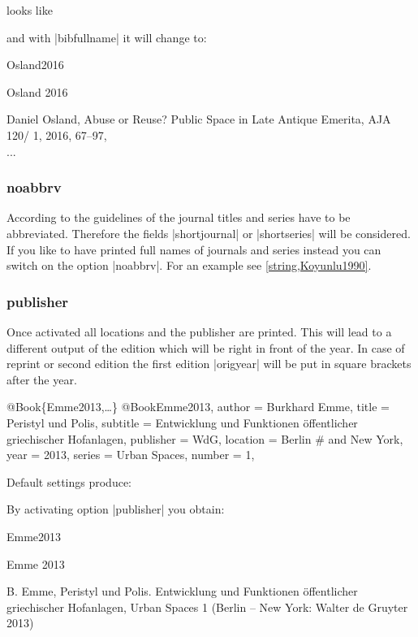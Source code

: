 \documentclass[a4paper,
10pt,
greek,
french,
spanish,
italian,
ngerman,
english,
]{ltxdoc}
\begin{document}
looks like


and with |bibfullname| it will change to:

\begin{bibbox}{Osland2016}\footnotesize
\parbox[t]{2cm}{Osland 2016} \parbox[t]{9cm}{{\color{red}Daniel} Osland, Abuse or Reuse? Public Space in Late Antique Emerita, AJA 120/ 1, 2016, 67–97,\\
...}
\end{bibbox}

\subsubsection{noabbrv}\label{noabbrevs}
According to the guidelines of the \DAI journal titles and series have to be abbreviated.
Therefore the fields |shortjournal| or |shortseries| will be considered. 
If you like to have printed full names of journals and series instead you can switch on the option |noabbrv|.
For an example see \cref{string,Koyunlu1990}.

\subsubsection{publisher}\label{publisher}
Once activated all locations and the publisher are printed. 
This will lead to a different output of the edition which will be right in front of the year.
In case of reprint or second edition the first edition |origyear| will be put in square brackets after the year.

\begin{bibexample}[label=Emme2013]{{@}Book\{Emme2013,…\}}
@Book{Emme2013,
  author    = {Burkhard Emme},
  title     = {Peristyl und Polis},
  subtitle  = {Entwicklung und Funktionen öffentlicher griechischer Hofanlagen},
  publisher = WdG,
  location  = Berlin #{ and New York}, %
  year      = {2013},
  series    = {Urban Spaces},
  number    = {1},
}
\end{bibexample}
\begin{refsection}\end{refsection}

Default settings produce:
 
By activating option |publisher| you obtain:

\begin{bibbox}{Emme2013}\footnotesize
\parbox[t]{1.7cm}{Emme 2013} \parbox[t]{9.4cm}{B. Emme, Peristyl und Polis. Entwicklung und Funktionen öffentlicher griechischer Hofanlagen, Urban Spaces 1 (Berlin {\color{red} – New York: Walter de Gruyter} 2013)}
\end{bibbox}
 
\end{document}
